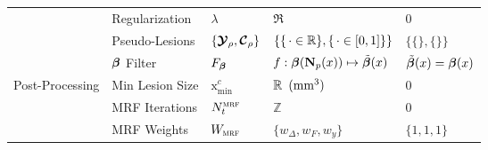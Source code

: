 \begin{table}
\begin{tabular}{lllll}
  	                                 & Regularization       & $\lambda$                   & $\Re$                                             & $0$                       \\
  	                                 & Pseudo-Lesions       & $\{\bm{\mathcal{Y}}_{\rho},\bm{\mathcal{C}}_{\rho}\}$ & $\{\{\thinspace\cdot\in\mathbb{R}\},\{\thinspace\cdot\in[0,1]\}\}$     & $\{\{\},\{\}\}$           \\
  	                                 & $\bm{\beta}$ Filter         & $F_{\bm{\beta}}$                   & $f: \bm{\beta}(\mathbf{N}_p(x)) \mapsto \tilde{\bm{\beta}}(x)$  & $\tilde{\bm{\beta}}(x) = \bm{\beta}(x)$ \\ \hline
  	\multirow{3}{*}{Post-Processing} & Min Lesion  Size     & $\mathrm{x}_{\min}^{c}$     & $\mathbb{R}\enspace(\text{mm}^{3})$                           & $0$                       \\
  	                                 & MRF Iterations       & $N_{t}^{\textsc{mrf}}$              & $\mathbb{Z}$                                      & $0$                       \\
  	                                 & MRF Weights          & $W_{\textsc{mrf}}$                  & $\{w_{\Delta},w_{F},w_y\}$                        & $\{1,1,1\}$               \\ \hline
  \end{tabular}
\end{table}
